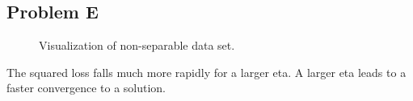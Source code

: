 \documentclass[12pt]{article} %
\begin{document}
\subsection{Problem E}

\begin{figure}[H]
	\vspace{-15mm}
	\caption{Visualization of non-separable data set.}
\end{figure}

The squared loss falls much more rapidly for a larger eta. A larger eta leads to a faster convergence to a solution.
 
\end{document}
